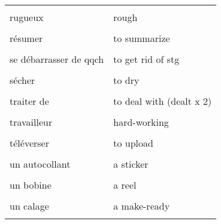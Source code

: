 \documentclass[
  10pt,
]{article}
\begin{document}
\begin{longtable}{ll}
\cellcolor{gray!6}{remarquer} & \cellcolor{gray!6}{to notice}\\

rugueux & rough\\

\cellcolor{gray!6}{réparer} & \cellcolor{gray!6}{to fix}\\

résumer & to summarize\\

\cellcolor{gray!6}{s'intéresser à qqch} & \cellcolor{gray!6}{to be interested in stg}\\

se débarrasser de qqch & to get rid of stg\\

\cellcolor{gray!6}{suivant} & \cellcolor{gray!6}{next}\\

sécher & to dry\\

\cellcolor{gray!6}{tard/en retard} & \cellcolor{gray!6}{late}\\

traiter de & to deal with (dealt x 2)\\

\cellcolor{gray!6}{traiter une commande} & \cellcolor{gray!6}{to run an order}\\

travailleur & hard-working\\

\cellcolor{gray!6}{télécharger} & \cellcolor{gray!6}{to download}\\

téléverser & to upload\\

\cellcolor{gray!6}{un appareil électronique} & \cellcolor{gray!6}{a device}\\

un autocollant & a sticker\\

\cellcolor{gray!6}{un blanchet} & \cellcolor{gray!6}{un blanket}\\

un bobine & a reel\\

\cellcolor{gray!6}{un bâtonnet (yeux)} & \cellcolor{gray!6}{a rod}\\

un calage & a make-ready\\

\cellcolor{gray!6}{un client} & \cellcolor{gray!6}{a customer}\\


\end{longtable}
\end{document}
